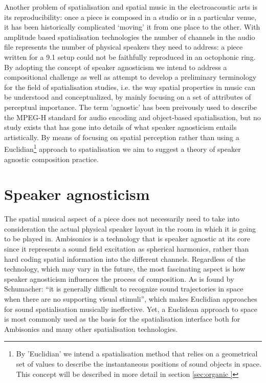 \documentclass{article}
\begin{document}
Another problem of spatialisation and spatial music in the electroacoustic arts is its reproducibility: once a piece is composed in a studio or in a particular venue, it has been historically complicated ‘moving’ it from one place to the other. With amplitude based spatialisation technologies the number of channels in the audio file represents the number of physical speakers they need to address: a piece written for a 9.1 setup could not be faithfully reproduced in an octophonic ring. 
By adopting the concept of speaker agnosticism we intend to address a compositional challenge as well as attempt to develop a preliminary terminology for the field of spatialisation studies, i.e. the way spatial properties in music can be understood and conceptualized, by mainly focusing on a set of attributes of perceptual importance.
The term 'agnostic' has been preivously used to describe the MPEG-H standard for audio encoding and object-based spatialisation\cite{quackenbush2021}, but no study exists that has gone into details of what speaker agnosticism entails artistically. By means of focusing on spatial perception rather than using a Euclidian\footnote{By 'Euclidian' we intend a spatialisation method that relies on a geometrical set of values to describe the instantaneous positions of sound objects in space. This concept will be described in more detail in section \ref{sec:organic }} approach to spatialisation we aim to suggest a theory of speaker agnostic composition practice. 
	\section{Speaker agnosticism}
	\label{sec:speaker_agnosticism}

The spatial musical aspect of a piece does not necessarily need to take into consideration the actual physical speaker layout in the room in which it is going to be played in. Ambisonics is a technology that is speaker agnostic at its core since it represents a sound field excitation as spherical harmonics\cite{Zotter2019}, rather than hard coding spatial information into the different channels. Regardless of the technology, which may vary in the future, the most fascinating aspect is how speaker agnosticism influences the process of composition. As is found by Schumacher: “it is generally difficult to recognize sound trajectories in space when there are no supporting visual stimuli”\cite{Schumacher2022}, which makes Euclidian approaches for sound spatialisation musically ineffective. Yet, a Euclidean approach to space is most commonly used as the basis for the spatialisation interface both for Ambisonics and many other spatialisation technologies. 
\end{document}
